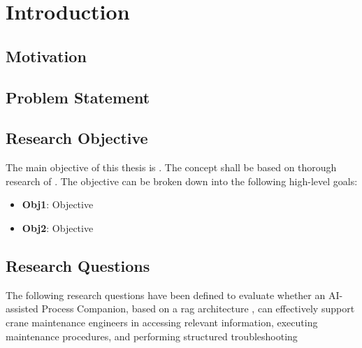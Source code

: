 \section{Introduction\label{sec:introduction}}


\subsection{Motivation}


\subsection{Problem Statement\label{sec:problem_statement}}

\subsection{Research Objective}

The main objective of this thesis is . 
The concept shall be based on thorough
research of . 
The objective can be
broken down into the following high-level goals:

\begin{itemize}
  \item \textbf{Obj1\label{ob:1}}: Objective
  \item \textbf{Obj2\label{ob:2}}: Objective
  \end{itemize}

\subsection{Research Questions}

The following research questions have been defined to evaluate whether an AI-assisted Process Companion, based on a \gls{rag} architecture , can effectively support crane maintenance engineers in accessing relevant information, executing maintenance procedures, and performing structured troubleshooting

